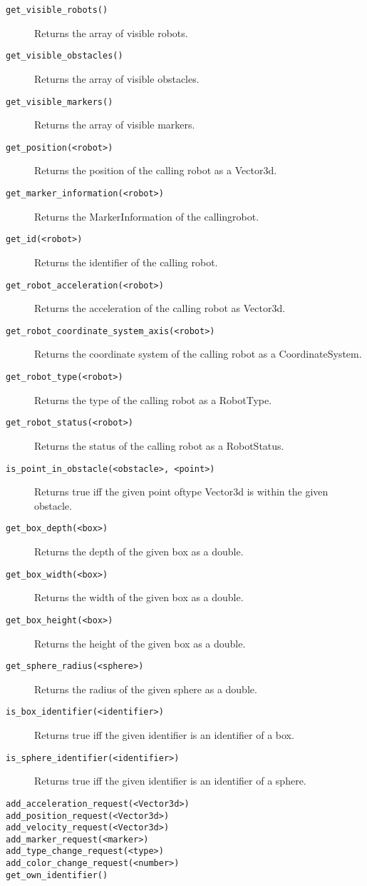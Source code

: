 \begin{description}
	\item [\texttt{get\_visible\_robots()}] Returns the array of visible robots.
	\item [\texttt{get\_visible\_obstacles()}] Returns the array of visible obstacles.
	\item [\texttt{get\_visible\_markers()}] Returns the array of visible markers.
	\item [\texttt{get\_position(<robot>)}] Returns the position of the calling robot as a Vector3d.
	\item [\texttt{get\_marker\_information(<robot>)}] Returns the MarkerInformation of the calling\linebreak robot.
	\item [\texttt{get\_id(<robot>)}] Returns the identifier of the calling robot.
	\item [\texttt{get\_robot\_acceleration(<robot>)}] Returns the acceleration of the calling robot as Vector3d.
	\item [\texttt{get\_robot\_coordinate\_system\_axis(<robot>)}] Returns the coordinate system of the calling robot as a CoordinateSystem.
	\item [\texttt{get\_robot\_type(<robot>)}] Returns the type of the calling robot as a RobotType.
	\item [\texttt{get\_robot\_status(<robot>)}] Returns the status of the calling robot as a RobotStatus.
	\item [\texttt{is\_point\_in\_obstacle(<obstacle>, <point>)}] Returns true iff the given point of\linebreak type Vector3d is within the given obstacle.
	\item [\texttt{get\_box\_depth(<box>)}] Returns the depth of the given box as a double.
	\item [\texttt{get\_box\_width(<box>)}] Returns the width of the given box as a double.
	\item [\texttt{get\_box\_height(<box>)}] Returns the height of the given box as a double.
	\item [\texttt{get\_sphere\_radius(<sphere>)}] Returns the radius of the given sphere as a double.
	\item [\texttt{is\_box\_identifier(<identifier>)}] Returns true iff the given identifier is an identifier of a box.
	\item [\texttt{is\_sphere\_identifier(<identifier>)}] Returns true iff the given identifier is an identifier of a sphere.
	\item [\texttt{add\_acceleration\_request(<Vector3d>)}] 
	\item [\texttt{add\_position\_request(<Vector3d>)}]
	\item [\texttt{add\_velocity\_request(<Vector3d>)}]
	\item [\texttt{add\_marker\_request(<marker>)}]
	\item [\texttt{add\_type\_change\_request(<type>)}]
	\item [\texttt{add\_color\_change\_request(<number>)}]
	\item [\texttt{get\_own\_identifier()}]
\end{description}


